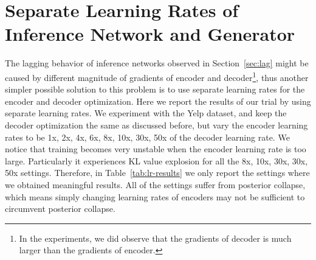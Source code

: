 \documentclass{article} \usepackage{iclr2019_conference,times}
\begin{document}
\section{Separate Learning Rates of Inference Network and Generator}\label{apdix:lr}
The lagging behavior of inference networks observed in Section~\ref{sec:lag} might be caused by different magnitude of gradients of encoder and decoder\footnote{In the experiments, we did observe that the gradients of decoder is much larger than the gradients of encoder.}, thus another simpler possible solution to this problem is to use separate learning rates for the encoder and decoder optimization. Here we report the results of our trial by using separate learning rates. We experiment with the Yelp dataset, and keep the decoder optimization the same as discussed before, but vary the encoder learning rates to be 1x, 2x, 4x, 6x, 8x, 10x, 30x, 50x of the decoder learning rate. We notice that training becomes very unstable when the encoder learning rate is too large. Particularly it experiences KL value explosion for all the 8x, 10x, 30x, 30x, 50x settings. Therefore, in Table~\ref{tab:lr-results} we only report the settings where we obtained meaningful results. All of the settings suffer from posterior collapse, which means simply changing learning rates of encoders may not be sufficient to circumvent posterior collapse.
\begin{table}[h]
    \centering
    \caption{Results on Yelp dataset varying learning rate of inference network. }
    \label{tab:lr-results}
\end{table}
\end{document}
